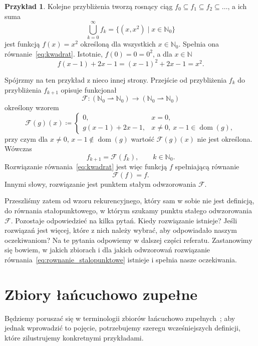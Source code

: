 \documentclass[11pt,a4paper]{article}
\theoremstyle{definition}
\newtheorem{przyklad}[definicja]{Przykład}
\theoremstyle{plain}
\newcommand{\dom}{\operatorname{dom}}
\begin{document}
\begin{przyklad}
	Kolejne przybliżenia tworzą rosnący ciąg
	$f_0\subseteq f_1\subseteq f_2\subseteq\ldots$, a ich suma
	\[
	\bigcup_{k=0}^{\infty}f_k=\{(x,x^2)\mid x\in\mathbb N_0\}
	\]
	jest funkcją $f(x)=x^2$ określoną dla wszystkich $x\in\mathbb N_0$.
	Spełnia ona równanie~\eqref{eq:kwadrat}. Istotnie, $f(0)=0=0^2$, a dla
	$x\in\mathbb{N}$
	\[
	f(x-1)+2x-1=(x-1)^2+2x-1=x^2.
	\]
	
	Spójrzmy na ten przykład z nieco innej strony. Przejście od przybliżenia
	$f_k$ do przybliżenia $f_{k+1}$ opisuje funkcjonał
	\[
	\mathcal{F}:
	(\mathbb{N}_0\rightharpoonup\mathbb{N}_0)
	\to
	(\mathbb{N}_0\rightharpoonup\mathbb{N}_0)
	\]
	określony wzorem
	\[
	\mathcal{F}(g)(x)\coloneqq
	\begin{cases}
		0, & x=0,\\
		g(x-1)+2x-1, & x\neq0,\ x-1\in\dom(g),
	\end{cases}
	\]
	przy czym dla $x\neq0$, $x-1\notin\dom(g)$ wartość $\mathcal F(g)(x)$
	nie jest określona. Wówczas
	\[
	f_{k+1}=\mathcal{F}(f_k),\qquad k\in\mathbb N_0.
	\]
	Rozwiązanie równania~\eqref{eq:kwadrat} jest więc funkcją $f$ spełniającą
	równanie
	\[
	\mathcal{F}(f)=f.
	\]
	Innymi słowy, rozwiązanie jest punktem stałym odwzorowania $\mathcal{F}$.
	
	Przeszliśmy zatem od wzoru rekurencyjnego, który sam w sobie nie jest
	definicją, do równania stałopunktowego, w którym szukamy punktu stałego
	odwzorowania $\mathcal{F}$. Pozostaje odpowiedzieć na kilka pytań.
	Kiedy rozwiązanie istnieje? Jeśli rozwiązań jest więcej, które z nich
	należy wybrać, aby odpowiadało naszym oczekiwaniom? Na te pytania
	odpowiemy w dalszej części referatu. Zastanowimy się bowiem, w jakich
	zbiorach i dla jakich odwzorowań rozwiązanie
	równania~\eqref{eq:rownanie_stalopunktowe} istnieje i spełnia nasze
	oczekiwania.
\end{przyklad}

\section{Zbiory łańcuchowo zupełne}\label{sec:cpo}

Będziemy poruszać się w terminologii zbiorów łańcuchowo zupełnych~\cite{gordon1979}; aby jednak
wprowadzić to pojęcie, potrzebujemy szeregu wcześniejszych definicji, które
zilustrujemy konkretnymi przykładami.
\end{document}
